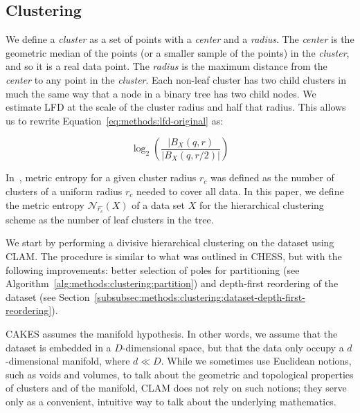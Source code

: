 \subsection{Clustering}
\label{subsec:methods:clustering}

We define a \emph{cluster} as a set of points with a \emph{center} and a \emph{radius}.
The \emph{center} is the geometric median of the points (or a smaller sample of the points) in the \emph{cluster}, and so it is a real data point.
The \emph{radius} is the maximum distance from the \emph{center} to any point in the \emph{cluster}.
Each non-leaf cluster has two child clusters in much the same way that a node in a binary tree has two child nodes.
We estimate LFD at the scale of the cluster radius and half that radius. 
This allows us to rewrite Equation~\ref{eq:methods:lfd-original} as:

\begin{equation} 
    \log_2 \left( \frac{|B_X(q, r)}{|B_X(q, r/2)|} \right)
    \label{eq:methods:lfd-simplified}
\end{equation}

In~\cite{yu2015entropy}, metric entropy for a given cluster radius $r_c$ was defined as the number of clusters of a uniform radius $r_c$ needed to cover all data.
In this paper, we define the metric entropy $\mathcal{N}_{\hat{r_c}}(X)$ of a data set $X$ for the hierarchical clustering scheme as the number of leaf clusters in the tree.


We start by performing a divisive hierarchical clustering on the dataset using CLAM.
The procedure is similar to what was outlined in CHESS, but with the following improvements:
better selection of poles for partitioning (see Algorithm~\ref{alg:methods:clustering:partition}) and depth-first reordering of the dataset (see Section~\ref{subsubsec:methods:clustering:dataset-depth-first-reordering}). 

CAKES assumes the manifold hypothesis. 
In other words, we assume that the dataset is embedded in a $D$-dimensional space, but that the data only occupy a $d$-dimensional manifold, where $d \ll D$. 
While we sometimes use Euclidean notions, such as voids and volumes, to talk about the geometric and topological properties of clusters and of the manifold, CLAM does not rely on such notions; 
they serve only as a convenient, intuitive way to talk about the underlying mathematics.


